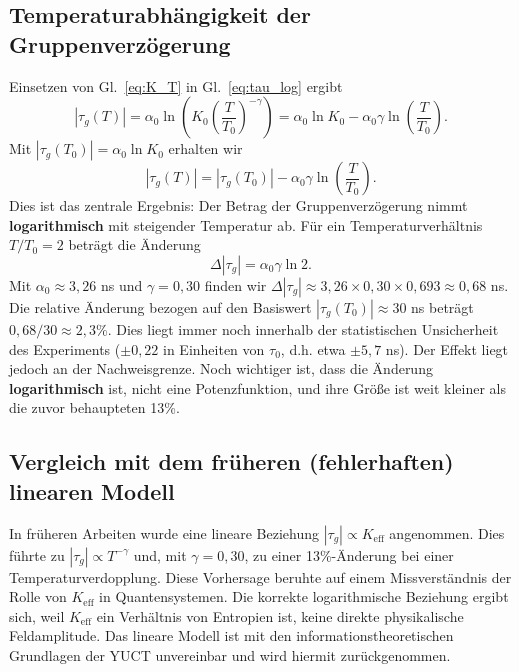 \documentclass[12pt,a4paper]{article}
\newcommand{\Keff}{K_{\mathrm{eff}}}
\begin{document}
	\subsection{Temperaturabhängigkeit der Gruppenverzögerung}
	
	Einsetzen von Gl.~\eqref{eq:K_T} in Gl.~\eqref{eq:tau_log} ergibt
	\begin{equation}
		|\tau_g(T)| = \alpha_0 \ln\!\left(K_0 \left(\frac{T}{T_0}\right)^{-\gamma}\right)
		= \alpha_0 \ln K_0 - \alpha_0 \gamma \ln\!\left(\frac{T}{T_0}\right).
	\end{equation}
	Mit \(|\tau_g(T_0)| = \alpha_0 \ln K_0\) erhalten wir
	\begin{equation}
		|\tau_g(T)| = |\tau_g(T_0)| - \alpha_0 \gamma \ln\!\left(\frac{T}{T_0}\right).
		\label{eq:tau_T_log}
	\end{equation}
	Dies ist das zentrale Ergebnis: Der Betrag der Gruppenverzögerung nimmt \textbf{logarithmisch} mit steigender Temperatur ab. Für ein Temperaturverhältnis \(T/T_0 = 2\) beträgt die Änderung
	\begin{equation}
		\Delta |\tau_g| = \alpha_0 \gamma \ln 2.
	\end{equation}
	Mit \(\alpha_0 \approx 3,26\) ns und \(\gamma = 0,30\) finden wir \(\Delta |\tau_g| \approx 3,26 \times 0,30 \times 0,693 \approx 0,68\) ns. Die relative Änderung bezogen auf den Basiswert \(|\tau_g(T_0)| \approx 30\) ns beträgt \(0,68 / 30 \approx 2,3\%\). Dies liegt immer noch innerhalb der statistischen Unsicherheit des Experiments (\(\pm 0,22\) in Einheiten von \(\tau_0\), d.h. etwa \(\pm 5,7\) ns). Der Effekt liegt jedoch an der Nachweisgrenze. Noch wichtiger ist, dass die Änderung \textbf{logarithmisch} ist, nicht eine Potenzfunktion, und ihre Größe ist weit kleiner als die zuvor behaupteten 13\%.
	
	\subsection{Vergleich mit dem früheren (fehlerhaften) linearen Modell}
	
	In früheren Arbeiten wurde eine lineare Beziehung \(|\tau_g| \propto \Keff\) angenommen. Dies führte zu \(|\tau_g| \propto T^{-\gamma}\) und, mit \(\gamma = 0,30\), zu einer 13\%-Änderung bei einer Temperaturverdopplung. Diese Vorhersage beruhte auf einem Missverständnis der Rolle von \(\Keff\) in Quantensystemen. Die korrekte logarithmische Beziehung ergibt sich, weil \(\Keff\) ein Verhältnis von Entropien ist, keine direkte physikalische Feldamplitude. Das lineare Modell ist mit den informationstheoretischen Grundlagen der YUCT unvereinbar und wird hiermit zurückgenommen.
	
\end{document}
